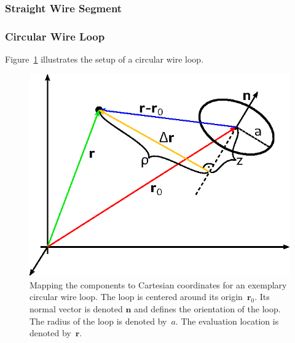\subsubsection{Straight Wire Segment}



\subsubsection{Circular Wire Loop}
Figure~\ref{fig:mappingToCartesian} illustrates the setup of a circular wire loop.
\begin{figure}[htbp]
 \centering
 \includegraphics{img/MappingToCartesian.eps}
 \caption{Mapping the components to Cartesian coordinates for an exemplary circular wire loop.
          The loop is centered around its origin~$\mathbf{r}_0$.
          Its normal vector is denoted $\mathbf{n}$ and defines the orientation of the loop.
          The radius of the loop is denoted by~$a$.
          The evaluation location is denoted by~$\mathbf{r}$.}
 \label{fig:mappingToCartesian}
\end{figure}

